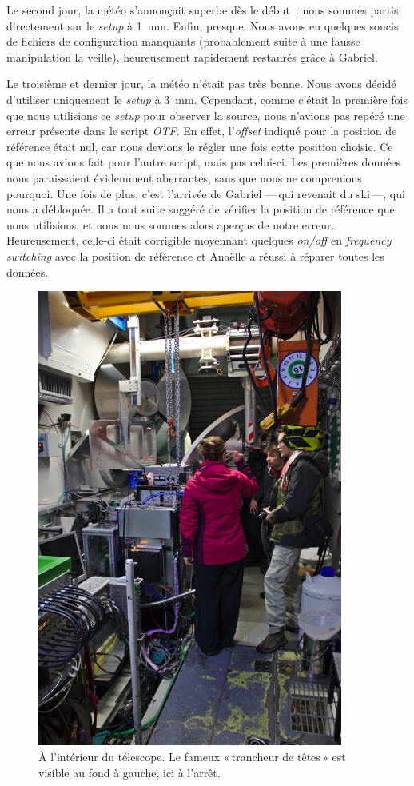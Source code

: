 \documentclass[a4paper,10pt,french]{article}
\newcommand{\setup}{\textit{setup}}
\newcommand{\troismm}{\SI{3}{\milli\meter}}
\newcommand{\unmm}{\SI{1}{\milli\meter}}
\begin{document}
Le second jour, la météo s’annonçait superbe dès le début : nous sommes partis
directement sur le \setup{} à \unmm. Enfin, presque. Nous avons eu quelques
soucis de fichiers de configuration manquants (probablement suite à une fausse
manipulation la veille), heureusement rapidement restaurés grâce à Gabriel.

Le troisième et dernier jour, la météo n’était pas très bonne. Nous avons
décidé d’utiliser uniquement le \setup{} à \troismm. Cependant, comme c’était
la première fois que nous utilisions ce \setup{} pour observer la source, nous
n’avions pas repéré une erreur présente dans le script \textit{OTF}. En effet,
l’\textit{offset} indiqué pour la position de référence était nul, car nous
devions le régler une fois cette position choisie. Ce que nous avions fait pour
l’autre script, mais pas celui-ci. Les premières données nous paraissaient
évidemment aberrantes, sans que nous ne comprenions pourquoi. Une fois de plus,
c’est l’arrivée de Gabriel — qui revenait du ski —, qui nous a débloquée. Il a
tout suite suggéré de vérifier la position de référence que nous utilisions, et
nous nous sommes alors aperçus de notre erreur. Heureusement, celle-ci était
corrigible moyennant quelques \textit{on/off} en \textit{frequency switching}
avec la position de référence et Anaëlle a réussi à réparer toutes les données.

\begin{figure}[!ht]
    \centering
    \includegraphics[width=0.895\textwidth]{inside.jpg}
    \caption{À l’intérieur du télescope. Le fameux « trancheur de têtes » est
    visible au fond à gauche, ici à l’arrêt.}
\end{figure}
\end{document}
